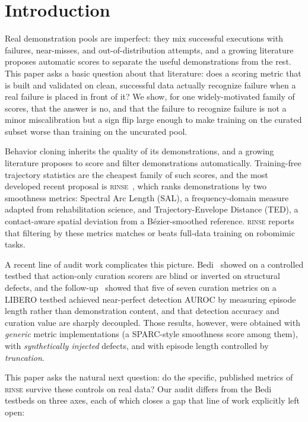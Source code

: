 \documentclass[10pt]{article}
\newcommand{\rinse}{\textsc{rinse}}
\begin{document}
\section{Introduction}

Real demonstration pools are imperfect: they mix successful executions with
failures, near-misses, and out-of-distribution attempts, and a growing
literature proposes automatic scores to separate the useful demonstrations
from the rest. This paper asks a basic question about that literature: does
a scoring metric that is built and validated on clean, successful data
actually recognize failure when a real failure is placed in front of it? We
show, for one widely-motivated family of scores, that the answer is no, and
that the failure to recognize failure is not a minor miscalibration but a
sign flip large enough to make training on the curated subset worse than
training on the uncurated pool.

Behavior cloning inherits the quality of its demonstrations, and a growing
literature proposes to score and filter demonstrations automatically.
Training-free trajectory statistics are the cheapest family of such scores,
and the most developed recent proposal is \rinse{}~\citep{rinse}, which ranks
demonstrations by two smoothness metrics: Spectral Arc Length (SAL), a
frequency-domain measure adapted from rehabilitation science, and
Trajectory-Envelope Distance (TED), a contact-aware spatial deviation from a
B\'ezier-smoothed reference. \rinse{} reports that filtering by these metrics
matches or beats full-data training on robomimic tasks.

A recent line of audit work complicates this picture.
Bedi~\citep{bedi-audit} showed on a controlled testbed that action-only
curation scorers are blind or inverted on structural defects, and the
follow-up~\citep{bedi-policy} showed that five of seven curation metrics on a
LIBERO testbed achieved near-perfect detection AUROC by measuring episode
length rather than demonstration content, and that detection accuracy and
curation value are sharply decoupled. Those results, however, were obtained
with \emph{generic} metric implementations (a SPARC-style smoothness score
among them), with \emph{synthetically injected} defects, and with episode
length controlled by \emph{truncation}.

This paper asks the natural next question: do the specific, published metrics
of \rinse{} survive these controls on real data? Our audit differs from the
Bedi testbeds on three axes, each of which closes a gap that line of work
explicitly left open:
\end{document}
